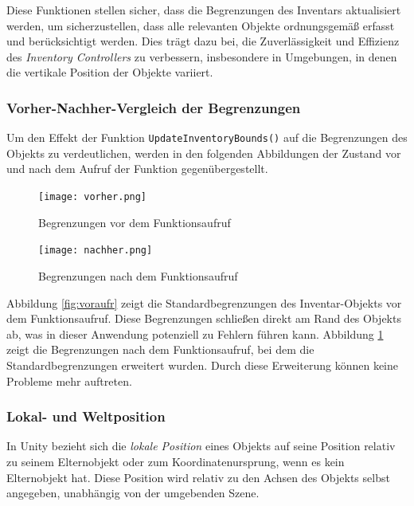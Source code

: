 Diese Funktionen stellen sicher, dass die Begrenzungen des Inventars aktualisiert werden, um sicherzustellen, dass alle
relevanten Objekte ordnungsgemäß erfasst und berücksichtigt werden. Dies trägt dazu bei, die Zuverlässigkeit und Effizienz
des \textit{Inventory Controllers} zu verbessern, insbesondere in Umgebungen, in denen die vertikale Position der Objekte
variiert.

\subsubsection*{Vorher-Nachher-Vergleich der Begrenzungen}
Um den Effekt der Funktion \texttt{UpdateInventoryBounds()} auf die Begrenzungen des Objekts zu verdeutlichen, werden
in den folgenden Abbildungen der Zustand vor und nach dem Aufruf der Funktion gegenübergestellt.

\begin{figure}[H]
    \centering
    \begin{minipage}[b]{0.45\textwidth}
        \centering
        \texttt{[image: vorher.png]}
        \caption{Begrenzungen vor dem Funktionsaufruf}
        \label{fig:voraufr}
    \end{minipage}
    \hfill
    \begin{minipage}[b]{0.45\textwidth}
        \centering
        \texttt{[image: nachher.png]}
        \caption{Begrenzungen nach dem Funktionsaufruf}
        \label{fig:nachaufr}
    \end{minipage}
\end{figure}

Abbildung \ref{fig:voraufr} zeigt die Standardbegrenzungen des Inventar-Objekts vor dem Funktionsaufruf. Diese Begrenzungen
schließen direkt am Rand des Objekts ab, was in dieser Anwendung potenziell zu Fehlern führen kann. Abbildung \ref{fig:nachaufr}
zeigt die Begrenzungen nach dem Funktionsaufruf, bei dem die Standardbegrenzungen erweitert wurden. Durch diese Erweiterung
können keine Probleme mehr auftreten.

\subsubsection*{Lokal- und Weltposition}
In Unity bezieht sich die \textit{lokale Position} eines Objekts auf seine Position relativ zu seinem Elternobjekt oder
zum Koordinatenursprung, wenn es kein Elternobjekt hat. Diese Position wird relativ zu den Achsen des Objekts selbst
angegeben, unabhängig von der umgebenden Szene.

